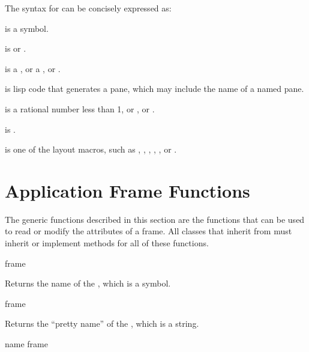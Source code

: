 The syntax for  can be concisely expressed as:

\begin{description}
\item {}

\item {} is a symbol.

\item {} is  or .

\item {} is a , or a , or
.

\item {} is lisp code that generates a pane, which may include
the name of a named pane.

\item {} is a rational number less than 1, or , or
.

\item {} is .

\item {} is one of the layout macros, such as
, , , , ,
or .
\end{description}


\section {Application Frame Functions}

The generic functions described in this section are the functions that can be
used to read or modify the attributes of a frame.  All classes that inherit from
 must inherit or implement methods for all of these
functions.

 {frame}

Returns the name of the  , which is a symbol.

 {frame}

Returns the ``pretty name'' of the  , which is a string.

 {name frame}

